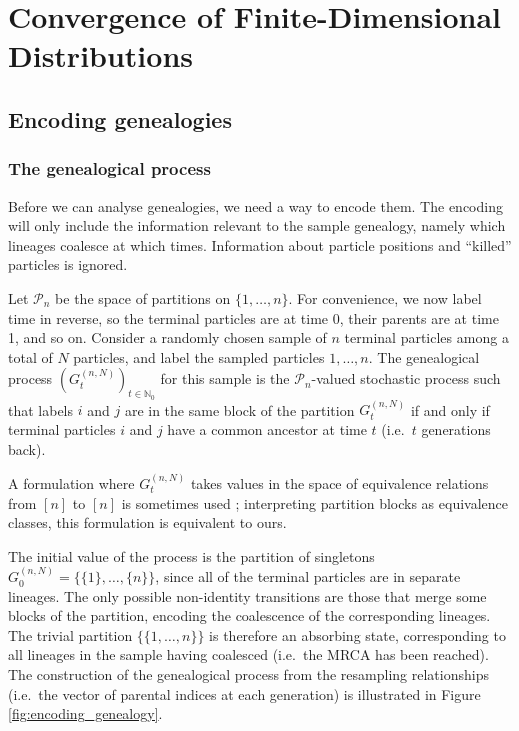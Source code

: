 \chapter{Convergence of Finite-Dimensional Distributions} %


\section{Encoding genealogies}

\subsection{The genealogical process}
Before we can analyse genealogies, we need a way to encode them.
The encoding will only include the information relevant to the sample genealogy, namely which lineages coalesce at which times. Information about particle positions and ``killed'' particles is ignored.

Let $\mathcal{P}_n$ be the space of partitions on $\{1,\dots,n\}$.
For convenience, we now label time in reverse, so the terminal particles are at time 0, their parents are at time 1, and so on.
Consider a randomly chosen sample of $n$ terminal particles among a total of $N$ particles, and label the sampled particles $1,\dots,n$.
The genealogical process $(G_t^{(n,N)})_{t\in\mathbb{N}_0}$ for this sample is the $\mathcal{P}_n$-valued stochastic process such that labels $i$ and $j$ are in the same block of the partition $G_t^{(n,N)}$ if and only if terminal particles $i$ and $j$ have a common ancestor at time $t$ (i.e.\ $t$ generations back).

A formulation where $G_t^{(n,N)}$ takes values in the space of equivalence relations from $[n]$ to $[n]$ is sometimes used \parencite[e.g.][]{mohle1999}; interpreting partition blocks as equivalence classes, this formulation is equivalent to ours.

The initial value of the process is the partition of singletons $G_0^{(n,N)} = \{ \{1\}, \dots, \{n\} \}$, since all of the terminal particles are in separate lineages.
The only possible non-identity transitions are those that merge some blocks of the partition, encoding the coalescence of the corresponding lineages.
The trivial partition $\{ \{1,\dots,n\} \}$ is therefore an absorbing state, corresponding to all lineages in the sample having coalesced (i.e.\ the MRCA has been reached).
The construction of the genealogical process from the resampling relationships (i.e.\ the vector of parental indices at each generation) is illustrated in Figure \ref{fig:encoding_genealogy}.

